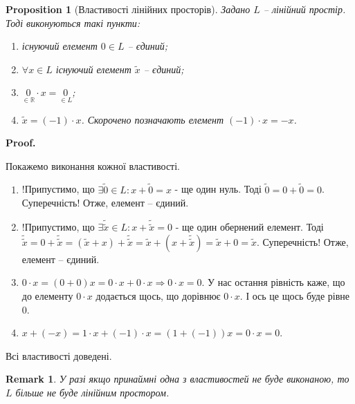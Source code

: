 \documentclass[a4paper, 10pt]{article}
\makeatletter
\theoremstyle{theoremdd}
\newtheorem{proposition}[theorem]{Proposition}
\newtheorem{remark}[theorem]{Remark}
\renewenvironment{proof}[1][Proof.\\]{\par
\pushQED{\hfill \qed}%
\normalfont \topsep6\p@\@plus6\p@\relax
\trivlist
\item\relax
{\bfseries
#1\@addpunct{.}}\hspace\labelsep\ignorespaces
}{%
\popQED\endtrivlist\@endpefalse
}
\makeatother
\begin{document}
	\begin{proposition}[Властивості лінійних просторів]
	Задано $L$ -- лінійний простір. Тоді виконуються такі пункти:
	\begin{enumerate}[nosep, wide=0pt, label={\arabic*)}]	
	\item існуючий елемент $0 \in L$ -- єдиний;
	\item $\forall x \in L$ існуючий елемент $\tilde{x}$ -- єдиний;
	\item $\underset{\in \mathbb{R}}{0} \cdot x = \underset{\in L}{0}$;
	\item $\tilde{x} = (-1) \cdot x$. Скорочено позначають елемент $(-1) \cdot x = -x$.
	\end{enumerate}
	\end{proposition}
	
	\begin{proof}
	Покажемо виконання кожної властивості.
	\begin{enumerate}[topsep=-\parskip, wide=0pt, label={\arabic*)}]
	\item !Припустимо, що $\exists \tilde{0} \in L: x + \tilde{0} = x$ - ще один нуль. Тоді $\tilde{0} = 0 + \tilde{0} = 0$. Суперечність! Отже, елемент -- єдиний.
	\item !Припустимо, що $\exists \tilde{\tilde{x}} \in L: x + \tilde{\tilde{x}} = 0$ - ще один обернений елемент. Тоді $\tilde{\tilde{x}} = 0 + \tilde{\tilde{x}} = (\tilde{x} + x) + \tilde{\tilde{x}} = \tilde{x} + (x + \tilde{\tilde{x}}) = \tilde{x} + 0 = \tilde{x}$. Суперечність! Отже, елемент -- єдиний.
	\item $0 \cdot x = (0 + 0)x = 0\cdot x + 0 \cdot x \Rightarrow 0 \cdot x = 0$. У нас остання рівність каже, що до елементу $0 \cdot x$ додається щось, що дорівнює $0 \cdot x$. І ось це щось буде рівне $0$.
	\item $x + (-x) = 1 \cdot x + (-1) \cdot x = (1 + (-1))x = 0 \cdot x = 0$.
	\end{enumerate}
	Всі властивості доведені.
	\end{proof}
	
	\begin{remark}
	У разі якщо принаймні одна з властивостей не буде виконаною, то $L$ більше не буде лінійним простором.
	\end{remark}
	
\end{document}
